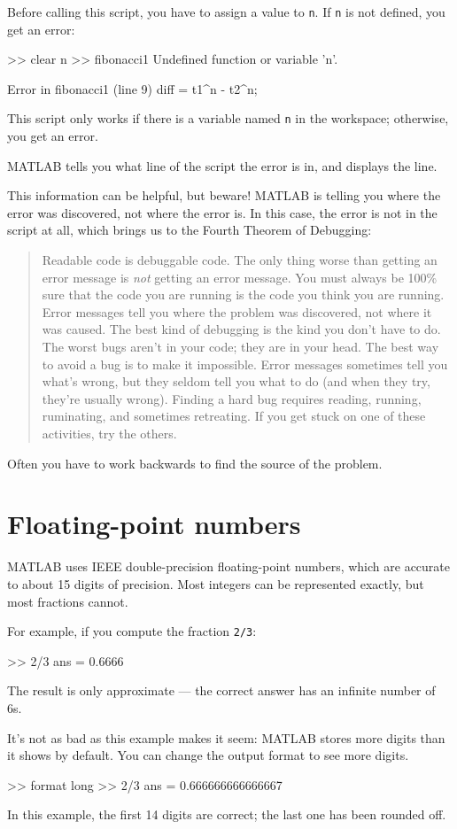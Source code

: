 \documentclass[
]{book}
\numberwithin{Answer}{chapter}
\numberwithin{Exercise}{chapter}
\newcommand{\displaythrm}[1]{%
    \ifthenelse{\equal{#1}{1}}%
        {Readable code is debuggable code.}{%
    \ifthenelse{\equal{#1}{2}}%
        {The only thing worse than getting an error message is {\em
         not} getting an error message.}{%
    \ifthenelse{\equal{#1}{3}}%
        {You must always be 100\% sure that the code you are running
         is the code you think you are running.}{%
    \ifthenelse{\equal{#1}{4}}%
        {Error messages tell you where the problem was discovered,
         not where it was caused.}{%
    \ifthenelse{\equal{#1}{5}}%
        {The best kind of debugging is the kind you don't have to do.}{%
    \ifthenelse{\equal{#1}{6}}%
        {The worst bugs aren't in your code; they are in your head.}{%
    \ifthenelse{\equal{#1}{7}}%
        {The best way to avoid a bug is to make it impossible.}{%
    \ifthenelse{\equal{#1}{8}}%
        {Error messages sometimes tell you what's wrong, but they
         seldom tell you what to do (and when they try, they're usually
         wrong).}{%
    \ifthenelse{\equal{#1}{9}}%
        {Finding a hard bug requires reading, running, ruminating,
         and sometimes retreating.  If you get stuck on one of these
         activities, try the others.}{%
    {}%
}}}}}}}}}}%
\begin{document}
Before calling this script, you have to assign a value to {\tt n}.
If {\tt n} is not defined, you get an error:

\begin{code}
>> clear n
>> fibonacci1
Undefined function or variable 'n'.

Error in fibonacci1 (line 9)
diff = t1^n - t2^n;
\end{code}

This script only works if there is a variable named {\tt n} in the workspace; otherwise, you get an error.

MATLAB tells you what line of the script the error is in, and displays the line.

This information can be helpful, but beware!  MATLAB is telling you
where the error was discovered, not where the error is.  In this
case, the error is not in the script at all, which brings us to the Fourth Theorem of Debugging:

\begin{quote}
\displaythrm{4}
\end{quote}

Often you have to work backwards to find the source of the problem.


\section{Floating-point numbers}

MATLAB uses IEEE double-precision floating-point numbers, which are accurate to about 15 digits of precision.  Most integers can be represented exactly, but most fractions cannot.

For example, if you compute the fraction {\tt 2/3}:

\begin{code}
>> 2/3
ans = 0.6666
\end{code}

The result is only approximate --- the correct answer has an infinite number of 6s. 

It's not as bad as this example makes it seem: MATLAB stores more digits than it shows by default.
You can change the output format to see more digits.


\begin{code}
>> format long
>> 2/3
ans = 0.666666666666667
\end{code}

In this example, the first 14 digits are correct; the last one has been rounded off.
\end{document}

